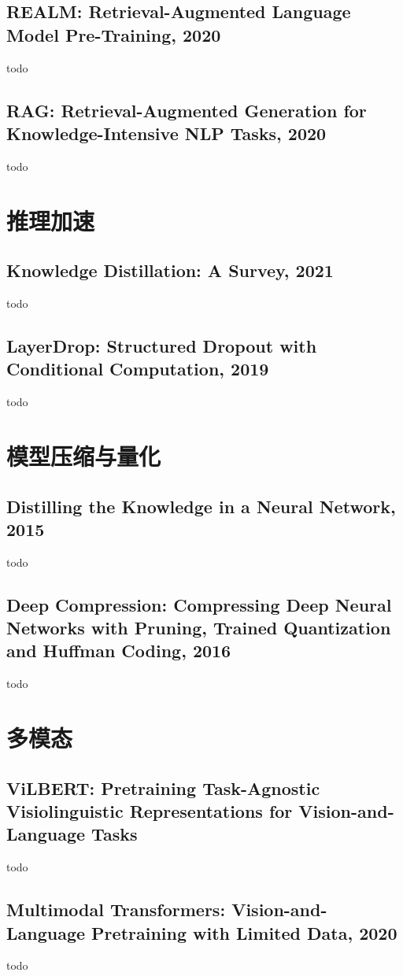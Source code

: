 \documentclass[twocolumn, 10pt]{article} %
\begin{document}
\subsection{REALM: Retrieval-Augmented Language Model Pre-Training, 2020}
todo
\subsection{RAG: Retrieval-Augmented Generation for Knowledge-Intensive NLP Tasks, 2020}
todo


\section{推理加速}
\subsection{Knowledge Distillation: A Survey, 2021}
todo 

\subsection{LayerDrop: Structured Dropout with Conditional Computation, 2019}
todo 

\section{模型压缩与量化}

\subsection{Distilling the Knowledge in a Neural Network, 2015}
todo 


\subsection{Deep Compression: Compressing Deep Neural Networks with Pruning, Trained Quantization and Huffman Coding, 2016}
todo 


\section{多模态}
\subsection{ViLBERT: Pretraining Task-Agnostic Visiolinguistic Representations for Vision-and-Language Tasks}
todo
\subsection{Multimodal Transformers: Vision-and-Language Pretraining with Limited Data, 2020}
todo
\end{document}
